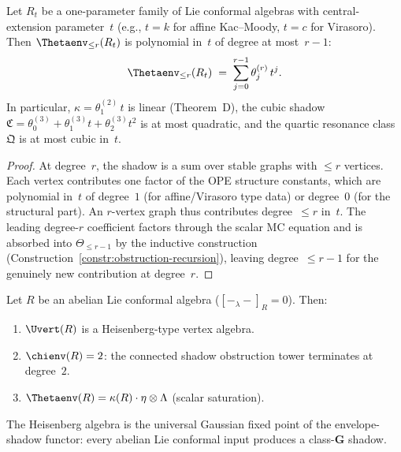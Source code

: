 \begin{proposition}
\label{prop:polynomial-level-dependence}
\ClaimStatusProvedHere
{}
Let $R_t$ be a one-parameter family of Lie conformal algebras
with central-extension parameter~$t$ \textup{(}e.g., $t = k$
for affine Kac--Moody, $t = c$ for Virasoro\textup{)}.
Then $\Thetaenv_{\leq r}(R_t)$ is polynomial in~$t$ of
degree at most~$r{-}1$:
\begin{equation}\label{eq:polynomial-level}
\Thetaenv_{\leq r}(R_t)
\;=\;
\sum_{j=0}^{r-1} \theta_j^{(r)} \, t^j.
\end{equation}
In particular, $\kappa = \theta_1^{(2)} \, t$ is linear
\textup{(}Theorem~D\textup{)}, the cubic shadow
$\mathfrak{C} = \theta_0^{(3)} + \theta_1^{(3)} t +
\theta_2^{(3)} t^2$ is at most quadratic, and the quartic
resonance class~$\mathfrak{Q}$ is at most cubic in~$t$.
\end{proposition}

\begin{proof}
At degree~$r$, the shadow is a sum over stable graphs with
$\leq r$ vertices. Each vertex contributes one factor of the
OPE structure constants, which are polynomial in~$t$ of
degree~$1$ (for affine/Virasoro type data) or degree~$0$
(for the structural part). An $r$-vertex graph thus
contributes degree~$\leq r$ in~$t$. The leading degree-$r$
coefficient factors through the scalar MC equation and is
absorbed into $\Theta_{\leq r-1}$ by the inductive
construction
(Construction~\ref{constr:obstruction-recursion}),
leaving degree~$\leq r{-}1$ for the genuinely new contribution
at degree~$r$.
\end{proof}

\begin{proposition}
\label{prop:gaussian-collapse-abelian}
\ClaimStatusConditional
{}
Let $R$ be an abelian Lie conformal algebra
\textup{(}$[{-}_\lambda{-}]_R = 0$\textup{)}. Then:
\begin{enumerate}[label=\textup{(\roman*)}]
\item $\Uvert(R)$ is a Heisenberg-type vertex algebra.
\item $\chienv(R) = 2$:
 the connected shadow obstruction tower terminates at degree~$2$.
\item $\Thetaenv(R) = \kappa(R) \cdot \eta \otimes \Lambda$
 \textup{(}scalar saturation\textup{)}.
\end{enumerate}
The Heisenberg algebra is the universal Gaussian fixed point
of the envelope-shadow functor: every abelian Lie conformal
input produces a class-$\mathbf{G}$ shadow.
\end{proposition}

